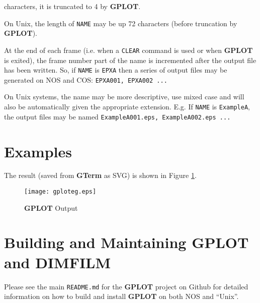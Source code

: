 \documentclass[a4paper,twoside,11pt]{article}
\makeatletter
\def\maxwidth{%
  \ifdim\Gin@nat@width>\linewidth
    \linewidth
  \else
    \Gin@nat@width
  \fi
}
\newcommand{\newpara}{\par\vspace{4mm}\noindent}
\makeatother
\begin{document}
characters, it is truncated to 4 by \textbf{GPLOT}.
\newpara
On Unix, the length of \texttt{NAME} may be up 72 characters (before truncation by \textbf{GPLOT}). 
\newpara
At the end of each frame (i.e. when a \texttt{CLEAR} command is used or when \textbf{GPLOT} is exited), the frame number part
of the name is incremented after the output file has been written. So, if \texttt{NAME} is \texttt{EPXA} then a series of
output files may be generated on NOS and COS: \texttt{EPXA001, EPXA002 ...}
\newpara
On Unix systems, the name may be more descriptive, use mixed case and will also be automatically given the 
appropriate extension. E.g. If \texttt{NAME} is \texttt{ExampleA}, the output files may be named
\texttt{ExampleA001.eps, ExampleA002.eps ...}

\section{Examples}


The result (saved from \textbf{GTerm} as SVG) is shown in Figure \ref{fig:aplot}.
\begin{figure}
	\centering
		\texttt{[image: gploteg.eps]}
	\caption{\textbf{GPLOT} Output}
	\label{fig:aplot}
\end{figure}

\section{Building and Maintaining \textbf{GPLOT} and DIMFILM}

Please see the main \texttt{README.md} for the \textbf{GPLOT} project on Github
for detailed information on how to build and install \textbf{GPLOT} on both NOS
and ``Unix''.
\end{document}
